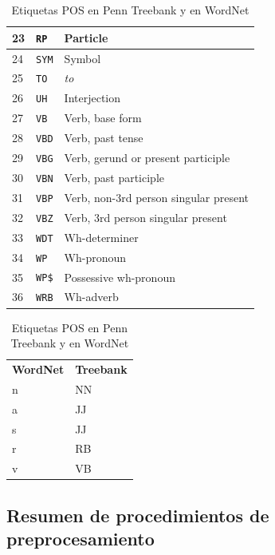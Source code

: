 \begin{table}[htbp]
\begin{subtable}[t]{0.60\linewidth}
\begin{tabular}{|l|l|l|}
23 & \verb=RP= & Particle \\ \hline
24 & \verb=SYM= & Symbol \\ \hline
25 & \verb=TO= & \emph{to} \\ \hline
26 & \verb=UH= & Interjection \\ \hline
27 & \verb=VB= & Verb, base form \\ \hline
28 & \verb=VBD= & Verb, past tense \\ \hline
29 & \verb=VBG= & Verb, gerund or present participle \\ \hline
30 & \verb=VBN= & Verb, past participle \\ \hline
31 & \verb=VBP= & Verb, non-3rd person singular present \\ \hline
32 & \verb=VBZ= & Verb, 3rd person singular present \\ \hline
33 & \verb=WDT= & Wh-determiner \\ \hline
34 & \verb=WP= & Wh-pronoun \\ \hline
35 & \verb=WP$= & Possessive wh-pronoun \\ \hline
36 & \verb=WRB= & Wh-adverb \\ \hline
\end{tabular}
\caption{POS tags del Penn Treebank}
\label{tbl:pos-tags-peen-treebank}
\end{subtable}
\begin{subtable}{0.38\linewidth}
\centering
\begin{tabular}{|l|l|}
\hline
\textbf{WordNet} & \textbf{Treebank} \\ \hhline{==}
n & NN \\ \hline
a & JJ \\ \hline
s & JJ \\ \hline
r & RB \\ \hline
v & VB \\ \hline
\end{tabular}
\caption{POS tags correspondientes en WordNet}
\label{tbl:pos-tags-wordnet}
\end{subtable}
\caption{Etiquetas POS en Penn Treebank y en WordNet}
\label{tbl:pos-tags}
\end{table}

\subsection{Resumen de procedimientos de preprocesamiento}

